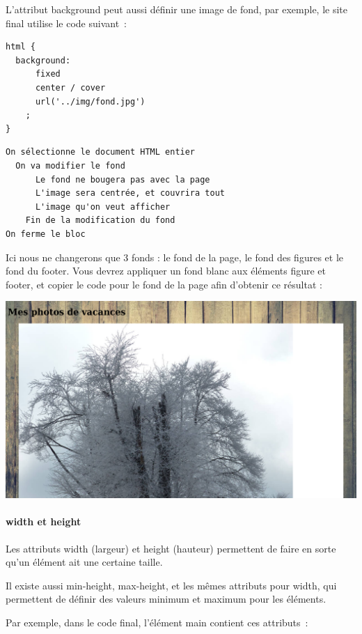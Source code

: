 L'attribut background peut aussi définir une image de fond, par exemple, le site
final utilise le code suivant :

\begin{minipage}{0.40\textwidth}
\begin{verbatim}
html {
  background:
      fixed
      center / cover
      url('../img/fond.jpg')
    ;
}
\end{verbatim}
\end{minipage}
\begin{minipage}{0.60\textwidth}
\begin{verbatim}
On sélectionne le document HTML entier
  On va modifier le fond
      Le fond ne bougera pas avec la page
      L'image sera centrée, et couvrira tout
      L'image qu'on veut afficher
    Fin de la modification du fond
On ferme le bloc
\end{verbatim}
\end{minipage}

Ici nous ne changerons que 3 fonds : le fond de la page, le fond des figures et
le fond du footer. Vous devrez appliquer un fond blanc aux éléments figure et
footer, et copier le code pour le fond de la page afin d'obtenir ce résultat :
\begin{center}\includegraphics[width=.8\linewidth]{img/screenshot_background.png}\end{center}

\paragraph{width et height}
Les attributs width (largeur) et height (hauteur) permettent de faire en sorte
qu'un élément ait une certaine taille.

Il existe aussi min-height, max-height,
et les mêmes attributs pour width, qui permettent de définir des valeurs minimum
et maximum pour les éléments.

Par exemple, dans le code final, l'élément main contient ces attributs :

